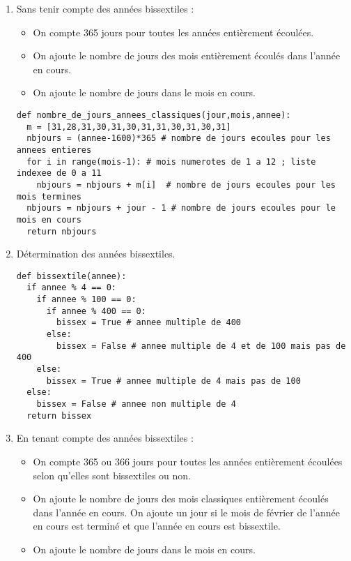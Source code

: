 \begin{enumerate}
 \item Sans tenir compte des années bissextiles :
 \begin{itemize}
  \item On compte 365 jours pour toutes les années entièrement écoulées. 
  \item On ajoute le nombre de jours des mois entièrement écoulés dans l'année en cours. 
  \item On ajoute le nombre de jours dans le mois en cours.                                                                                                                                                                                                           \end{itemize}

\begin{verbatim}
def nombre_de_jours_annees_classiques(jour,mois,annee):
  m = [31,28,31,30,31,30,31,31,30,31,30,31]
  nbjours = (annee-1600)*365 # nombre de jours ecoules pour les annees entieres
  for i in range(mois-1): # mois numerotes de 1 a 12 ; liste indexee de 0 a 11
    nbjours = nbjours + m[i]  # nombre de jours ecoules pour les mois termines
  nbjours = nbjours + jour - 1 # nombre de jours ecoules pour le mois en cours
  return nbjours
\end{verbatim}

 \item Détermination des années bissextiles.

\begin{verbatim}
def bissextile(annee):
  if annee % 4 == 0:
    if annee % 100 == 0:
      if annee % 400 == 0: 
        bissex = True # annee multiple de 400
      else:
        bissex = False # annee multiple de 4 et de 100 mais pas de 400
    else:
      bissex = True # annee multiple de 4 mais pas de 100
  else:
    bissex = False # annee non multiple de 4
  return bissex
\end{verbatim}

 \item En tenant compte des années bissextiles :
 \begin{itemize}
  \item On compte 365 ou 366 jours pour toutes les années entièrement écoulées selon qu'elles sont bissextiles ou non. 
  \item On ajoute le nombre de jours des mois classiques entièrement écoulés dans l'année en cours. On ajoute un jour si le mois de février de l'année en cours est terminé et que l'année en cours est bissextile.
  \item On ajoute le nombre de jours dans le mois en cours.
  \end{itemize}


\end{enumerate}
